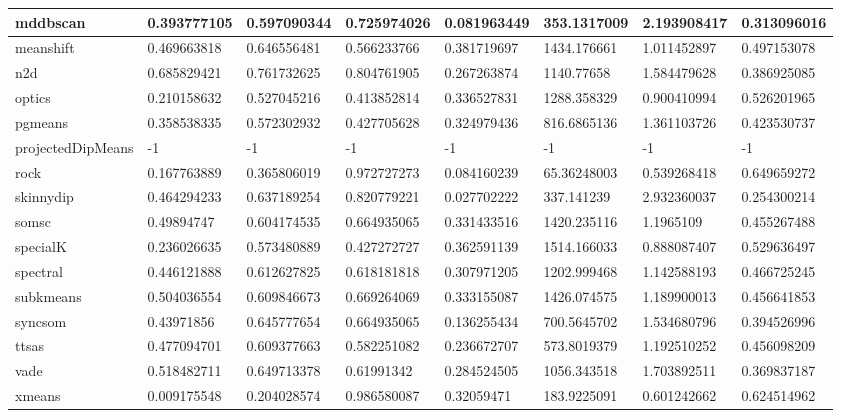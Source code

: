 \begin{table}[H]
\begin{tabular}{|l|l|l|l|l|l|l|l|}
\hline
mddbscan & 0.393777105 & 0.597090344 & 0.725974026 & 0.081963449 & 353.1317009 & 2.193908417 & 0.313096016 \\
\hline
meanshift & 0.469663818 & 0.646556481 & 0.566233766 & 0.381719697 & 1434.176661 & 1.011452897 & 0.497153078 \\
\hline
n2d & 0.685829421 & 0.761732625 & 0.804761905 & 0.267263874 & 1140.77658 & 1.584479628 & 0.386925085 \\
\hline
optics & 0.210158632 & 0.527045216 & 0.413852814 & 0.336527831 & 1288.358329 & 0.900410994 & 0.526201965 \\
\hline
pgmeans & 0.358538335 & 0.572302932 & 0.427705628 & 0.324979436 & 816.6865136 & 1.361103726 & 0.423530737 \\
\hline
projectedDipMeans & -1 & -1 & -1 & -1 & -1 & -1 & -1 \\
\hline
rock & 0.167763889 & 0.365806019 & 0.972727273 & 0.084160239 & 65.36248003 & 0.539268418 & 0.649659272 \\
\hline
skinnydip & 0.464294233 & 0.637189254 & 0.820779221 & 0.027702222 & 337.141239 & 2.932360037 & 0.254300214 \\
\hline
somsc & 0.49894747 & 0.604174535 & 0.664935065 & 0.331433516 & 1420.235116 & 1.1965109 & 0.455267488 \\
\hline
specialK & 0.236026635 & 0.573480889 & 0.427272727 & 0.362591139 & 1514.166033 & 0.888087407 & 0.529636497 \\
\hline
spectral & 0.446121888 & 0.612627825 & 0.618181818 & 0.307971205 & 1202.999468 & 1.142588193 & 0.466725245 \\
\hline
subkmeans & 0.504036554 & 0.609846673 & 0.669264069 & 0.333155087 & 1426.074575 & 1.189900013 & 0.456641853 \\
\hline
syncsom & 0.43971856 & 0.645777654 & 0.664935065 & 0.136255434 & 700.5645702 & 1.534680796 & 0.394526996 \\
\hline
ttsas & 0.477094701 & 0.609377663 & 0.582251082 & 0.236672707 & 573.8019379 & 1.192510252 & 0.456098209 \\
\hline
vade & 0.518482711 & 0.649713378 & 0.61991342 & 0.284524505 & 1056.343518 & 1.703892511 & 0.369837187 \\
\hline
xmeans & 0.009175548 & 0.204028574 & 0.986580087 & 0.32059471 & 183.9225091 & 0.601242662 & 0.624514962 \\
\hline
\end{tabular}
\end{table}

\clearpage

